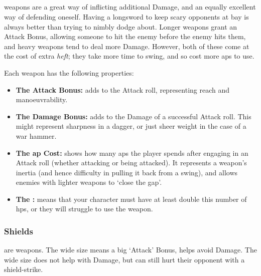 \begin{multicols}{2}

\subsection{}

\noindent
\Glspl{weapon} are a great way of inflicting additional Damage, and an equally excellent way of defending oneself.
Having a longsword to keep scary opponents at bay is always better than trying to nimbly dodge about.
Longer \glspl{weapon} grant an Attack Bonus, allowing someone to hit the enemy before the enemy hits them, and heavy \glspl{weapon} tend to deal more Damage.
However, both of these come at the cost of extra \emph{heft}; they take more time to swing, and so cost more \glspl{ap} to use.

Each \gls{weapon} has the following properties:

\begin{itemize}

  \item
  \textbf{The Attack Bonus:} adds to the Attack roll, representing reach and manoeuvrability.
  \item
  \textbf{The Damage Bonus:} adds to the Damage of a successful Attack roll.
  This might represent sharpness in a dagger, or just sheer weight in the case of a war hammer.
  \item
  \textbf{The \Gls{ap} Cost:} shows how many \glspl{ap} the player spends after engaging in an Attack roll (whether attacking or being attacked).
  It represents a weapon's inertia (and hence difficulty in pulling it back from a swing), and allows enemies with lighter weapons to `close the gap'.
  \item
  \textbf{The :} means that your character must have at least double this number of \glspl{hp}, or they will struggle to use the weapon.
\end{itemize}

\weaponsChart
\label{weaponschart}

\subsubsection{Shields}
\label{shields}
are weapons.
The wide size means a big `Attack' Bonus, helps avoid Damage.
The wide size does not help with Damage, but  can still hurt their opponent with a shield-strike.


\end{multicols}

